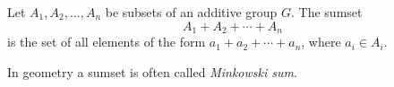 \documentclass[12pt]{article}
\begin{document}
Let $A_1, A_2, \dotsc, A_n$ be subsets of an additive group $G$. The sumset
\begin{equation*}
A_1+A_2+\dotsb+A_n
\end{equation*}
is the set of all elements of the form $a_1+a_2+\dotsb+a_n$, where $a_i \in A_i$.

In geometry a sumset is often called \emph{Minkowski sum}.
\end{document}
